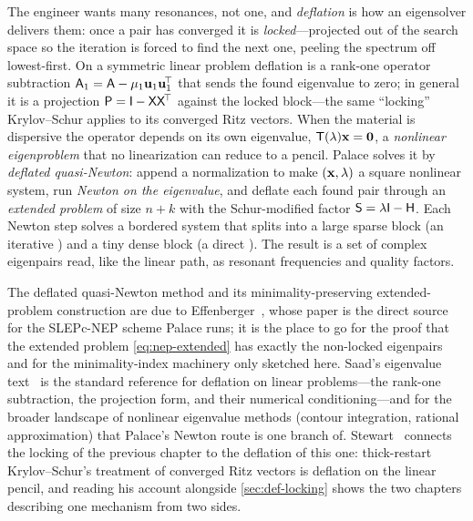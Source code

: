 \summarysection
The engineer wants many resonances, not one, and \emph{deflation} is how an
eigensolver delivers them: once a pair has converged it is \emph{locked}---projected
out of the search space so the iteration is forced to find the next one, peeling
the spectrum off lowest-first. On a symmetric linear problem deflation is a
rank-one operator subtraction $\mathsf{A}_1=\mathsf{A}-\mu_1\mathbf{u}_1\mathbf{u}_1^{\!\top}$ that
sends the found eigenvalue to zero; in general it is a projection
$\mathsf{P}=\mathsf{I}-\mathsf{X}\mathsf{X}^{\!\top}$ against the locked block---the same
``locking'' Krylov--Schur applies to its converged Ritz vectors. When the material
is dispersive the operator depends on its own eigenvalue,
$\mathsf{T}(\lambda)\mathbf{x}=\mathbf 0$, a \emph{nonlinear eigenproblem} that no
linearization can reduce to a pencil. Palace solves it by \emph{deflated
quasi-Newton}: append a normalization to make $(\mathbf{x},\lambda)$ a square nonlinear
system, run \emph{Newton on the eigenvalue}, and deflate each found pair through an
\emph{extended problem} of size $n+k$ with the Schur-modified factor
$\mathsf{S}=\lambda\mathsf{I}-\mathsf{H}$. Each Newton step solves a bordered system that
splits into a large sparse block (an iterative ) and a tiny dense
block (a direct ). The result is a set of complex eigenpairs read,
like the linear path, as resonant frequencies and quality factors.

\furtherreading
The deflated quasi-Newton method and its minimality-preserving extended-problem
construction are due to Effenberger~\citep{effenberger2013}, whose paper is the
direct source for the SLEPc-NEP scheme Palace runs; it is the place to go for the
proof that the extended problem \cref{eq:nep-extended} has exactly the
non-locked eigenpairs and for the minimality-index machinery only sketched here.
Saad's eigenvalue text~\citep{saad2011eig} is the standard reference for deflation
on linear problems---the rank-one subtraction, the projection form, and their
numerical conditioning---and for the broader landscape of nonlinear eigenvalue
methods (contour integration, rational approximation) that Palace's Newton route
is one branch of. Stewart~\citep{stewart2001krylovschur} connects the locking of
the previous chapter to the deflation of this one: thick-restart Krylov--Schur's
treatment of converged Ritz vectors is deflation on the linear pencil, and reading
his account alongside \cref{sec:def-locking} shows the two chapters describing one
mechanism from two sides.

